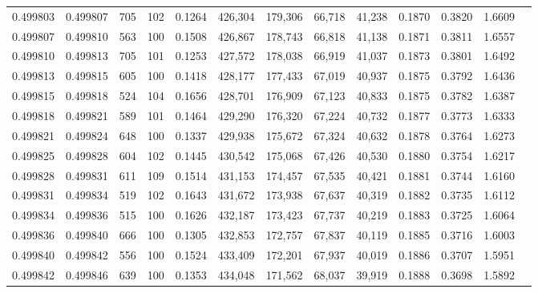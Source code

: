 \begin{tabular}{rrrrrrrrrrrrr}
0.499803 & 0.499807 &   705 & 102 &                                     0.1264 & 426,304 & 179,306 &  66,718 &  41,238 & 0.1870 & 0.3820 & 1.6609 \\
0.499807 & 0.499810 &   563 & 100 &                                     0.1508 & 426,867 & 178,743 &  66,818 &  41,138 & 0.1871 & 0.3811 & 1.6557 \\
0.499810 & 0.499813 &   705 & 101 &                                     0.1253 & 427,572 & 178,038 &  66,919 &  41,037 & 0.1873 & 0.3801 & 1.6492 \\
0.499813 & 0.499815 &   605 & 100 &                                     0.1418 & 428,177 & 177,433 &  67,019 &  40,937 & 0.1875 & 0.3792 & 1.6436 \\
0.499815 & 0.499818 &   524 & 104 &                                     0.1656 & 428,701 & 176,909 &  67,123 &  40,833 & 0.1875 & 0.3782 & 1.6387 \\
0.499818 & 0.499821 &   589 & 101 &                                     0.1464 & 429,290 & 176,320 &  67,224 &  40,732 & 0.1877 & 0.3773 & 1.6333 \\
0.499821 & 0.499824 &   648 & 100 &                                     0.1337 & 429,938 & 175,672 &  67,324 &  40,632 & 0.1878 & 0.3764 & 1.6273 \\
0.499825 & 0.499828 &   604 & 102 &                                     0.1445 & 430,542 & 175,068 &  67,426 &  40,530 & 0.1880 & 0.3754 & 1.6217 \\
0.499828 & 0.499831 &   611 & 109 &                                     0.1514 & 431,153 & 174,457 &  67,535 &  40,421 & 0.1881 & 0.3744 & 1.6160 \\
0.499831 & 0.499834 &   519 & 102 &                                     0.1643 & 431,672 & 173,938 &  67,637 &  40,319 & 0.1882 & 0.3735 & 1.6112 \\
0.499834 & 0.499836 &   515 & 100 &                                     0.1626 & 432,187 & 173,423 &  67,737 &  40,219 & 0.1883 & 0.3725 & 1.6064 \\
0.499836 & 0.499840 &   666 & 100 &                                     0.1305 & 432,853 & 172,757 &  67,837 &  40,119 & 0.1885 & 0.3716 & 1.6003 \\
0.499840 & 0.499842 &   556 & 100 &                                     0.1524 & 433,409 & 172,201 &  67,937 &  40,019 & 0.1886 & 0.3707 & 1.5951 \\
0.499842 & 0.499846 &   639 & 100 &                                     0.1353 & 434,048 & 171,562 &  68,037 &  39,919 & 0.1888 & 0.3698 & 1.5892 \\

\end{tabular}
